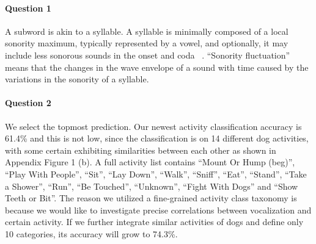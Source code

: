 \documentclass[letterpaper]{article}
\newcommand{\MY}[1]{\textcolor{orange}{(Mengyue: #1)}}
\begin{document}
\paragraph{Question 1}
A subword is akin to a syllable. A syllable is minimally composed of a local sonority maximum, typically represented by a vowel, and optionally, it may include less sonorous sounds in the onset and coda ~\cite{rasanen2018pre}. 
``Sonority fluctuation'' means that the changes in the wave envelope of a sound with time caused by the variations in the sonority of a syllable. 

\paragraph{Question 2}


We select the topmost prediction. 
Our newest activity classification accuracy is 61.4\% and this is not low, since the classification is on 14 different dog activities, with some certain exhibiting similarities between each other as shown in Appendix Figure 1 (b).  
A full activity list contains ``Mount Or Hump (beg)'', ``Play With People'', ``Sit'',
``Lay Down'', ``Walk'', ``Sniff'', ``Eat'', ``Stand'', ``Take a
Shower'', ``Run'', ``Be Touched'', ``Unknown'', ``Fight With Dogs'' and ``Show Teeth or Bit''. The reason we utilized a fine-grained activity class taxonomy is because we would like to investigate precise correlations between vocalization and certain activity. 
If we further integrate similar activities of dogs and define only 10 categories, its accuracy will grow to 74.3\%.
\end{document}

